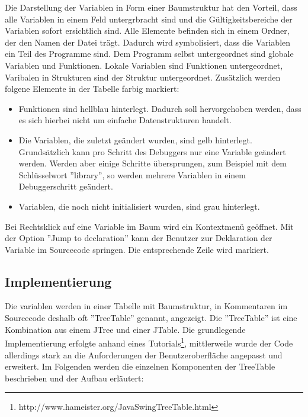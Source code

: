 Die Darstellung der Variablen in Form einer Baumstruktur hat den Vorteil, dass alle Variablen in einem Feld untergrbracht sind und die Gültigkeitsbereiche der Variablen sofort ersichtlich sind.
\newline
Alle Elemente befinden sich in einem Ordner, der den Namen der Datei trägt. Dadurch wird symbolisiert, dass die Variablen ein Teil des Programme sind. Dem Programm selbst untergeordnet sind globale Variablen und Funktionen. Lokale Variablen sind Funktionen untergeordnet, Varibalen in Strukturen sind der Struktur untergeordnet.
\newline
Zusätzlich werden folgene Elemente in der Tabelle farbig markiert:
\begin{itemize}
\item Funktionen sind hellblau hinterlegt. Dadurch soll hervorgehoben werden, dass es sich hierbei nicht um einfache Datenstrukturen handelt.
\item Die Variablen, die zuletzt geändert wurden, sind gelb hinterlegt. Grundsätzlich kann pro Schritt des Debuggers nur eine Variable geändert werden. Werden aber einige Schritte übersprungen, zum Beispiel mit dem Schlüsselwort ''library'', so werden mehrere Variablen in einem Debuggerschritt geändert.
\item Variablen, die noch nicht initialisiert wurden, sind grau hinterlegt.
\end{itemize}

Bei Rechtsklick auf eine Variable im Baum wird ein Kontextmenü geöffnet. Mit der Option ''Jump to declaration'' kann der Benutzer zur Deklaration der Variable im Sourcecode springen. Die entsprechende Zeile wird markiert.

\subsection{Implementierung}

Die variablen werden in einer Tabelle mit Baumstruktur, in Kommentaren im Sourcecode deshalb oft ''TreeTable'' genannt, angezeigt. Die ''TreeTable'' ist eine Kombination aus einem JTree und einer JTable. Die grundlegende Implementierung erfolgte anhand eines Tutorials\footnote{http://www.hameister.org/JavaSwingTreeTable.html}, mittlerweile wurde der Code allerdings stark an die Anforderungen der Benutzeroberfläche angepasst und erweitert.
\newline
Im Folgenden werden die einzelnen Komponenten der TreeTable beschrieben und der Aufbau erläutert:

